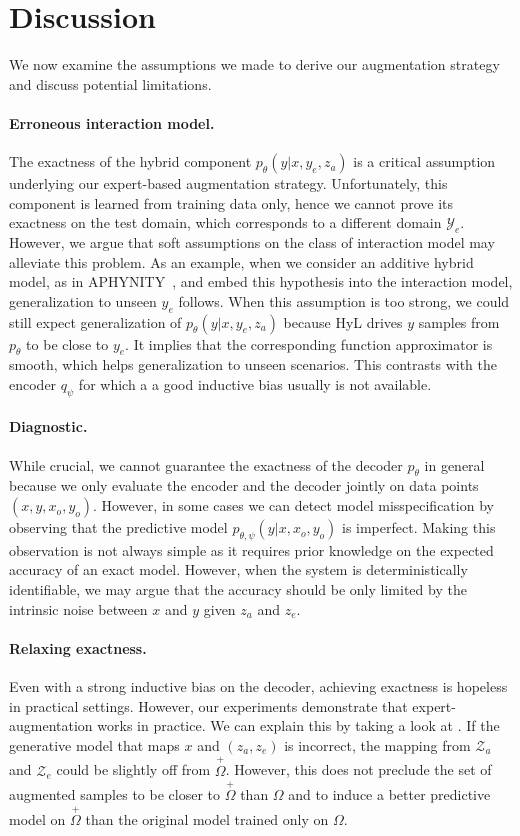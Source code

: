 \section{Discussion}
We now examine the assumptions we made to derive our augmentation strategy and discuss potential limitations.
\paragraph{Erroneous interaction model.}
The exactness of the hybrid component $p_\theta(y|x, y_e, z_a)$ is a critical assumption underlying our expert-based augmentation strategy. Unfortunately, this component is learned from training data only, hence we cannot prove its exactness on the test domain, which corresponds to a different domain $\mathcal{Y}_e$. However, we argue that soft assumptions on the class of interaction model may alleviate this problem. As an example, when we consider an additive hybrid model, as in APHYNITY~\citep{APHYNITY}, and embed this hypothesis into the interaction model, generalization to unseen $y_e$ follows. When this assumption is too strong, we could still expect generalization of $p_\theta(y|x, y_e, z_a)$ because HyL drives $y$ samples from $p_\theta$ to be close to $y_e$. It implies that the corresponding function approximator is smooth, which helps generalization to unseen scenarios. This contrasts with the encoder $q_\psi$ for which a a good inductive bias usually is not available.
\paragraph{Diagnostic.}
While crucial, we cannot guarantee the exactness of the decoder $p_\theta$ in general because we only evaluate the encoder and the decoder jointly on data points $(x, y, x_o, y_o)$. However, in some cases we can detect model misspecification by observing that the predictive model $p_{\theta, \psi}(y|x, x_o, y_o)$ is imperfect. Making this observation is not always simple as it requires prior knowledge on the expected accuracy of an exact model. However, when the system is deterministically identifiable, we may argue that the accuracy should be only limited by the intrinsic noise between $x$ and $y$ given $z_a$ and $z_e$.

\paragraph{Relaxing exactness.}
Even with a strong inductive bias on the decoder, achieving exactness is hopeless in practical settings. However, our experiments demonstrate that expert-augmentation works in practice. We can explain this by taking a look at . If the generative model that maps $x$ and $(z_a, z_e)$ is incorrect, the mapping from $\mathcal{Z}_a$ and $\mathcal{Z}_e$ could be slightly off from $\overset{+}{\Omega}$.  However, this does not preclude the set of augmented samples to be closer to $\overset{+}{\Omega}$ than $\Omega$ and to induce a better predictive model on $\overset{+}{\Omega}$ than the original model trained only on $\Omega$.

